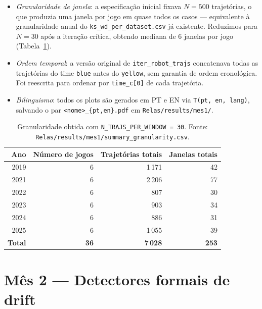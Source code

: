 \documentclass[11pt,a4paper]{article}
\begin{document}
\begin{itemize}[leftmargin=1.4em,itemsep=2pt]
    \item \emph{Granularidade de janela}: a especifica\c{c}\~ao inicial
          fixava $N=500$ trajet\'orias, o que produzia uma janela por jogo
          em quase todos os casos --- equivalente \`a granularidade anual
          do \texttt{ks\_wd\_per\_dataset.csv} j\'a existente. Reduzimos
          para $N=30$ ap\'os a itera\c{c}\~ao cr\'itica, obtendo mediana
          de 6 janelas por jogo (Tabela~\ref{tab:granularity}).
    \item \emph{Ordem temporal}: a vers\~ao original de
          \texttt{iter\_robot\_trajs} concatenava todas as trajet\'orias
          do time \texttt{blue} antes do \texttt{yellow}, sem garantia
          de ordem cronol\'ogica. Foi reescrita para ordenar por
          \texttt{time\_c[0]} de cada trajet\'oria.
    \item \emph{Bilinguismo}: todos os plots s\~ao gerados em PT e EN via
          \texttt{T(pt, en, lang)}, salvando o par
          \texttt{<nome>\_\{pt,en\}.pdf} em \texttt{Relas/results/mes1/}.
\end{itemize}

\begin{table}[h]
\centering
\small
\begin{tabular}{rrrr}
\toprule
\textbf{Ano} & \textbf{N\'umero de jogos} & \textbf{Trajet\'orias totais} & \textbf{Janelas totais} \\
\midrule
2019 & 6 & 1\,171 & 42 \\
2021 & 6 & 2\,206 & 77 \\
2022 & 6 &   807 & 30 \\
2023 & 6 &   903 & 34 \\
2024 & 6 &   886 & 31 \\
2025 & 6 & 1\,055 & 39 \\
\midrule
\textbf{Total} & \textbf{36} & \textbf{7\,028} & \textbf{253} \\
\bottomrule
\end{tabular}
\caption{Granularidade obtida com \texttt{N\_TRAJS\_PER\_WINDOW = 30}.
         Fonte: \texttt{Relas/results/mes1/summary\_granularity.csv}.}
\label{tab:granularity}
\end{table}

\section{M\^es 2 --- Detectores formais de drift}
\end{document}
